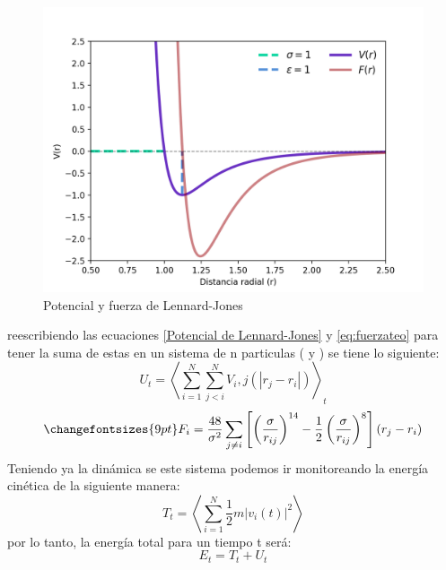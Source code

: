 \documentclass[reprint,amsmath,amssymb,aps,]{revtex4-2}
\begin{document}
\begin{figure}[H]
    \centering
    \includegraphics[scale=0.45]{../Graphics/Potencial.png}
    \caption{Potencial y fuerza de Lennard-Jones}
    \label{pot-len-jones}
\end{figure}
reescribiendo las ecuaciones \ref{Potencial de Lennard-Jones} y \ref{eq:fuerzateo} para tener la suma de estas en un sistema de n particulas (\cite{Nose1991} y \cite{Lee2005}) se tiene lo siguiente:
\begin{equation}
    \label{eq:pot-n}
    U_t=\left\langle\sum_{i=1}^N \sum_{j<i}^N V_i,j(|r_j-r_i|)\right\rangle_t
\end{equation}
\begin{equation}
    \changefontsizes{9pt}
    \label{eq:f-n}
    F_i = \frac{48}{\sigma^2} \sum_{j \ne i} \left[\left(\frac{\sigma}{r_{ij}}\right)^{14}-\frac{1}{2}\left(\frac{\sigma}{r_{ij}} \right)^8  \right] (r_j-r_i)
\end{equation}
Teniendo ya la dinámica se este sistema podemos ir monitoreando la energía cinética de la siguiente manera:
\begin{equation}
    \label{eq:kin-n}
    T_t=\left\langle \sum_{i=1}^N \frac{1}{2}m|v_i(t)|^2\right\rangle
\end{equation}
por lo tanto, la energía total para un tiempo t será:
\begin{equation}
    \label{eq:e-tot}
    E_t=T_t+U_t
\end{equation}
\end{document}
